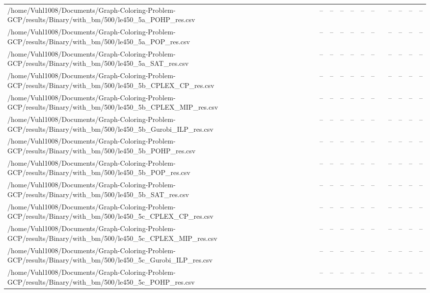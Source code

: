 \begin{table}[htbp]
\begin{tabular}{llllllllllll}
/home/Vuhl1008/Documents/Graph-Coloring-Problem-GCP/results/Binary/with\_bm/500/le450\_5a\_POHP\_res.csv & -- & -- & -- & -- & -- & -- & {} & -- & -- & -- & -- \\
/home/Vuhl1008/Documents/Graph-Coloring-Problem-GCP/results/Binary/with\_bm/500/le450\_5a\_POP\_res.csv & -- & -- & -- & -- & -- & -- & {} & -- & -- & -- & -- \\
/home/Vuhl1008/Documents/Graph-Coloring-Problem-GCP/results/Binary/with\_bm/500/le450\_5a\_SAT\_res.csv & -- & -- & -- & -- & -- & -- & {} & -- & -- & -- & -- \\
/home/Vuhl1008/Documents/Graph-Coloring-Problem-GCP/results/Binary/with\_bm/500/le450\_5b\_CPLEX\_CP\_res.csv & -- & -- & -- & -- & -- & -- & {} & -- & -- & -- & -- \\
/home/Vuhl1008/Documents/Graph-Coloring-Problem-GCP/results/Binary/with\_bm/500/le450\_5b\_CPLEX\_MIP\_res.csv & -- & -- & -- & -- & -- & -- & {} & -- & -- & -- & -- \\
/home/Vuhl1008/Documents/Graph-Coloring-Problem-GCP/results/Binary/with\_bm/500/le450\_5b\_Gurobi\_ILP\_res.csv & -- & -- & -- & -- & -- & -- & {} & -- & -- & -- & -- \\
/home/Vuhl1008/Documents/Graph-Coloring-Problem-GCP/results/Binary/with\_bm/500/le450\_5b\_POHP\_res.csv & -- & -- & -- & -- & -- & -- & {} & -- & -- & -- & -- \\
/home/Vuhl1008/Documents/Graph-Coloring-Problem-GCP/results/Binary/with\_bm/500/le450\_5b\_POP\_res.csv & -- & -- & -- & -- & -- & -- & {} & -- & -- & -- & -- \\
/home/Vuhl1008/Documents/Graph-Coloring-Problem-GCP/results/Binary/with\_bm/500/le450\_5b\_SAT\_res.csv & -- & -- & -- & -- & -- & -- & {} & -- & -- & -- & -- \\
/home/Vuhl1008/Documents/Graph-Coloring-Problem-GCP/results/Binary/with\_bm/500/le450\_5c\_CPLEX\_CP\_res.csv & -- & -- & -- & -- & -- & -- & {} & -- & -- & -- & -- \\
/home/Vuhl1008/Documents/Graph-Coloring-Problem-GCP/results/Binary/with\_bm/500/le450\_5c\_CPLEX\_MIP\_res.csv & -- & -- & -- & -- & -- & -- & {} & -- & -- & -- & -- \\
/home/Vuhl1008/Documents/Graph-Coloring-Problem-GCP/results/Binary/with\_bm/500/le450\_5c\_Gurobi\_ILP\_res.csv & -- & -- & -- & -- & -- & -- & {} & -- & -- & -- & -- \\
/home/Vuhl1008/Documents/Graph-Coloring-Problem-GCP/results/Binary/with\_bm/500/le450\_5c\_POHP\_res.csv & -- & -- & -- & -- & -- & -- & {} & -- & -- & -- & -- \\

\end{tabular}
\end{table}
